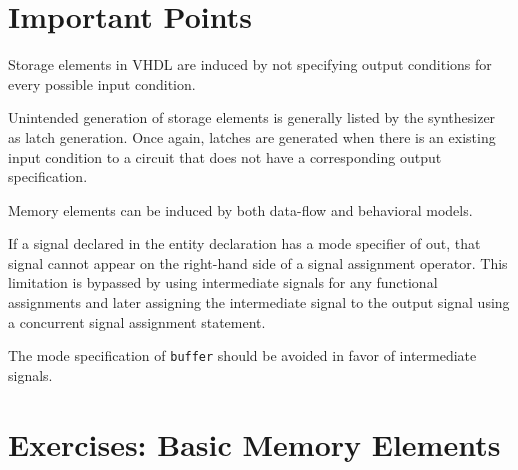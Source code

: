 \section{Important Points}
\begin{my_list}
\item Storage elements in VHDL are induced by not specifying output conditions for every possible input condition.

\item Unintended generation of storage elements is generally listed by the synthesizer as latch generation. Once again, latches are generated when there is an existing input condition to a circuit that does not have a corresponding output specification.

\item Memory elements can be induced by both data-flow and behavioral models.

\item If a signal declared in the entity declaration has a mode specifier of out, that signal cannot appear on the right-hand side of a signal assignment operator. This limitation is bypassed by using intermediate signals for any functional assignments and later assigning the intermediate signal to the output signal using a concurrent signal assignment statement.

\item The mode specification of \texttt{buffer} should be avoided in favor of intermediate signals.
\end{my_list}

\section{Exercises: Basic Memory Elements}

